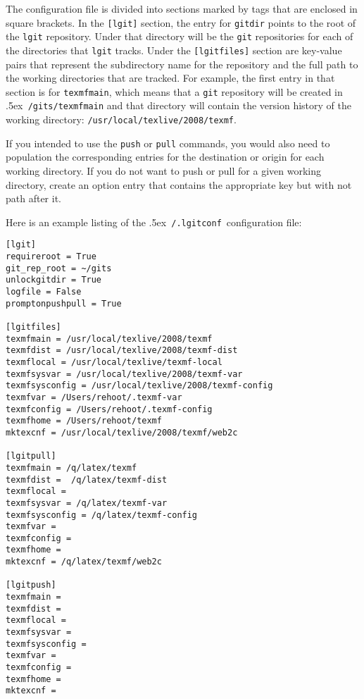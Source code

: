 \documentclass{ltxdoc}
\def\bobtilde{\lower.5ex\hbox{\tt \string~}}%
\def\ucmd#1{{\tt {#1}}}
\def\lgitconf{\bobtilde\ucmd{/.lgitconf}}
\def\mygits{\bobtilde\ucmd{/gits}}
\begin{document}
The configuration file is divided into sections marked by tags that are enclosed in square brackets.  In the \ucmd{[lgit]} section, the entry for \ucmd{gitdir} points to the root of the \ucmd{lgit} repository.  Under that directory will be the \ucmd{git} repositories for each of the directories that \ucmd{lgit} tracks.  Under the \ucmd{[lgitfiles]} section are key-value pairs that represent the subdirectory name for the repository and the full path to the working directories that are tracked.  For example, the first entry in that section is for \ucmd{texmfmain}, which means that a \ucmd{git} repository will be created in \mygits\ucmd{/texmfmain} and that directory will contain the version history of the working directory: \ucmd{/usr/local/texlive/2008/texmf}.

If you intended to use the \ucmd{push} or \ucmd{pull} commands, you would also need to population the corresponding entries for the destination or origin for each working directory.  If you do not want to push or pull for a given working directory, create an option entry that contains the appropriate key but with not path after it.

Here is an example listing of the \lgitconf\ configuration file:
\begin{verbatim}
[lgit]
requireroot = True
git_rep_root = ~/gits
unlockgitdir = True
logfile = False
promptonpushpull = True

[lgitfiles]
texmfmain = /usr/local/texlive/2008/texmf
texmfdist = /usr/local/texlive/2008/texmf-dist
texmflocal = /usr/local/texlive/texmf-local
texmfsysvar = /usr/local/texlive/2008/texmf-var
texmfsysconfig = /usr/local/texlive/2008/texmf-config
texmfvar = /Users/rehoot/.texmf-var
texmfconfig = /Users/rehoot/.texmf-config
texmfhome = /Users/rehoot/texmf
mktexcnf = /usr/local/texlive/2008/texmf/web2c

[lgitpull]
texmfmain = /q/latex/texmf
texmfdist =  /q/latex/texmf-dist
texmflocal = 
texmfsysvar = /q/latex/texmf-var
texmfsysconfig = /q/latex/texmf-config
texmfvar = 
texmfconfig = 
texmfhome = 
mktexcnf = /q/latex/texmf/web2c

[lgitpush]
texmfmain =
texmfdist =
texmflocal =
texmfsysvar =
texmfsysconfig =
texmfvar =
texmfconfig =
texmfhome =
mktexcnf =
\end{verbatim}
\end{document}
